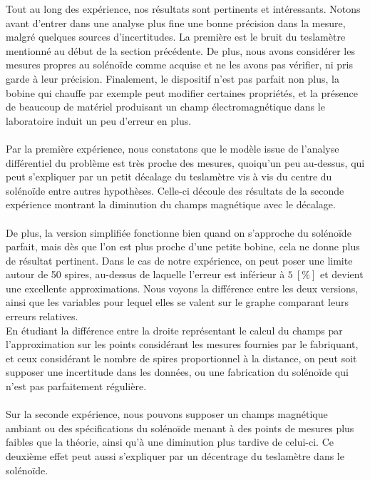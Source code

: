 
Tout au long des expérience, nos résultats sont pertinents et intéressants. Notons avant d'entrer dans une analyse plus fine une bonne précision dans la mesure, malgré quelques sources d'incertitudes. La première est le bruit du teslamètre mentionné au début de la section précédente. De plus, nous avons considérer les mesures propres au solénoïde comme acquise et ne les avons pas vérifier, ni pris garde à leur précision. Finalement, le dispositif n'est pas parfait non plus, la bobine qui chauffe par exemple peut modifier certaines propriétés, et la présence de beaucoup de matériel produisant un champ électromagnétique dans le laboratoire induit un peu d'erreur en plus.\\ \\
Par la première expérience, nous constatons que le modèle issue de l'analyse différentiel du problème est très proche des mesures, quoiqu'un peu au-dessus, qui peut s'expliquer par un petit décalage du teslamètre vis à vis du centre du solénoïde entre autres hypothèses. Celle-ci découle des résultats de la seconde expérience montrant la diminution du champs magnétique avec le décalage.\\ \\
De plus, la version simplifiée fonctionne bien quand on s'approche du solénoïde parfait, mais dès que l'on est plus proche d'une petite bobine, cela ne donne plus de résultat pertinent. Dans le cas de notre expérience, on peut poser une limite autour de 50 spires, au-dessus de laquelle l'erreur est inférieur à $5 \ [\%]$ et devient une excellente approximations. Nous voyons la différence entre les deux versions, ainsi que les variables pour lequel elles se valent sur le graphe comparant leurs erreurs relatives.\\
En étudiant la différence entre la droite représentant le calcul du champs par l'approximation sur les points considérant les mesures fournies par le fabriquant, et ceux considérant le nombre de spires proportionnel à la distance, on peut soit supposer une incertitude dans les données, ou une fabrication du solénoïde qui n'est pas parfaitement régulière.\\ \\
Sur la seconde expérience, nous pouvons supposer un champs magnétique ambiant ou des spécifications du solénoïde menant à des points de mesures plus faibles que la théorie, ainsi qu'à une diminution plus tardive de celui-ci. Ce deuxième effet peut aussi s'expliquer par un décentrage du teslamètre dans le solénoïde.\\ \\
